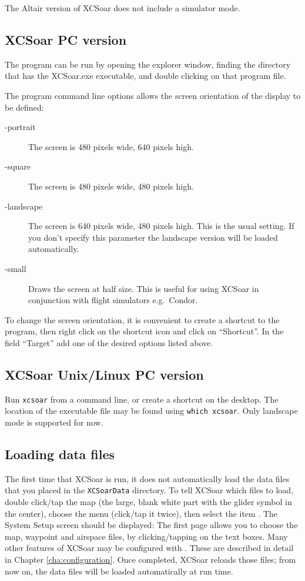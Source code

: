 The Altair version of XCSoar does not include a simulator mode.

\subsection*{XCSoar PC version}
The program can be run by opening the explorer window, finding the directory
that has the XCSoar.exe executable, and double clicking on that program file.

The program command line options allows the screen orientation of
the display to be defined:
\begin{description}
\item[-portrait] The screen is 480 pixels wide, 640 pixels high.
\item[-square] The screen is 480 pixels wide, 480 pixels high.
\item[-landscape] The screen is 640 pixels wide, 480 pixels high. This is the
usual setting. If you don't specify this parameter the landscape version will be
loaded automatically.
\item[-small] Draws the screen at half size.  This is useful for using XCSoar in
 conjunction with flight simulators e.g.\ Condor.
\end{description}
To change the screen orientation, it is convenient to create a shortcut to the
program, then right click on the shortcut icon and click on ``Shortcut''. 
In the field ``Target'' add one of the desired options listed above.

\subsection*{XCSoar Unix/Linux PC version}
Run \verb|xcsoar| from a command line, or create a shortcut on the
desktop.  The location of the executable file may be found using
\verb|which xcsoar|.  Only landscape mode is  supported for now.

\subsection*{Loading data files}
The first time that XCSoar is run, it does not automatically load the 
data files that you placed in the \verb|XCSoarData| directory.  
To tell XCSoar which files to load, double click/tap the map (the large,
blank white part with the glider symbol in the center),
choose the menu  (click/tap it twice), then select the item 
.  The System Setup screen should be displayed:
The first page allows you to choose the map, 
waypoint and airspace files, by clicking/tapping on the text boxes.
Many other features of XCSoar may be configured with
. These are described in detail in Chapter
\ref{cha:configuration}.
Once completed, XCSoar reloads those files; from now on, the data files
will be loaded automatically at run time.

